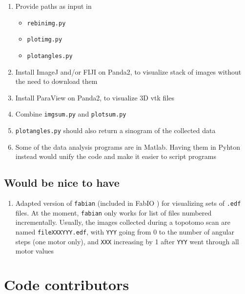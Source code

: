 \documentclass[11pt]{scrartcl}
\begin{document}
\begin{enumerate}
    \item Provide paths as input in 
    \begin{itemize}
        \item {\texttt{rebin\textunderscore img.py}}
        \item {\texttt{plot\textunderscore img.py}}
        \item {\texttt{plot\textunderscore angles.py}}
    \end{itemize}
    \item Install ImageJ and/or {\footnotesize{FIJI}} on Panda2, to visualize stack of images without the need to download them
    \item Install ParaView on Panda2, to visualize {\footnotesize{3D}} vtk files
    \item Combine {\texttt{img\textunderscore sum.py}} and {\texttt{plot\textunderscore sum.py}}
    \item {\texttt{plot\textunderscore angles.py}} should also return a sinogram of the collected data
    \item Some of the data analysis programs are in Matlab. Having them in Pyhton instead would unify the code and make it easier to script programs 
\end{enumerate}

\subsection{Would be nice to have}

\begin{enumerate}
    \item Adapted version of {\texttt{fabian}} (included in FabIO \cite{knudsen2013fabio}) for visualizing sets of {\texttt{.edf}} files. At the moment, {\texttt{fabian}} only works for list of files numbered incrementally. Usually, the images collected during a topotomo scan are named {\texttt{file\textunderscore XXX\textunderscore YYY.edf}}, with {\texttt{YYY}} going from 0 to the number of angular steps (one motor only), and {\texttt{XXX}} increasing by 1 after {\texttt{YYY}} went through all motor values
\end{enumerate}

\section{Code contributors}
\end{document}
